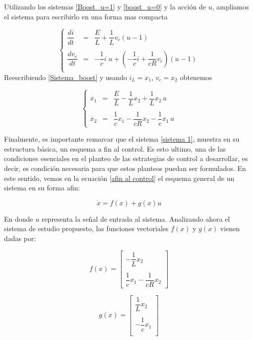 \documentclass[10pt]{article}
\begin{document}
Utilizando los sistemas \eqref{Boost_u=1} y \eqref{boost_u=0} y la acción de $u$, ampliamos el sistema para escribirlo en una forma mas compacta

 \begin{equation}  \label{Sistema_boost}
\left\lbrace  \begin{array}{rcl}
		\dfrac{di}{dt}	&=	&\dfrac{E}{L}+\dfrac{1}{L}v_{c} (u-1)\\
						&	&\\
		\dfrac{dv_{c}}{dt} &=	&-\dfrac{1}{c} i\; u + \left( -\dfrac{1}{c}i + \dfrac{1}{cR}v_{c} \right) \left(u-1\right) \\
\end{array}
\right. 
\end{equation}
Reescribiendo \eqref{Sistema_boost} y usando $i_{L}=x_{1}$, $v_{c}=x_{2}$ obtenemos

\begin{equation}
\left\lbrace \begin{array}{lcl} \label{sistema 1}
			 \dot{x_{1}}	&=	&\dfrac{E}{L}-\dfrac{1}{L}x_{2} + \dfrac{1}{L}x_{2}\,u\\
			 				&	&\\
			 \dot{x_{2}}	&=	&\dfrac{1}{c}x_{1}-\dfrac{1}{cR}x_{2}-\dfrac{1}{c}x_{1}\,u
\end{array}
\right. 
\end{equation}

Finalmente, es importante remarcar que el sistema \eqref{sistema 1}, muestra en su estructura básica, un esquema a fin al control. Es esto ultimo, una de las condiciones esenciales en el planteo de las estrategias de control a desarrollar, es decir, es condición necesaria para que estos planteos puedan ser formulados. En este sentido, vemos en la ecuación \eqref{afin al control} el esquema general de un sistema en su forma afin:

\begin{equation} \label{afin al control}
\dot{x}=f(x)+g(x)u
\end{equation}

En donde $u$ representa la señal de entrada al sistema. Analizando ahora el sistema de estudio propuesto, las funciones vectoriales $f(x)$ y $g(x)$ vienen dadas por:\\

\begin{multicols}{2}
\[
f(x)=\left[ \begin{array}{c}
			-\dfrac{1}{L}x_{2}\\
			\\
			\dfrac{1}{c}x_{1}-\dfrac{1}{cR}x_{2}
\end{array}
\right]
\]

\[
g(x)=\left[ \begin{array}{c}
			\dfrac{1}{L}x_{2}\\
			\\
			-\dfrac{1}{c}x_{1}\\
\end{array}
\right]
\]
\end{multicols}





%
\end{document}
